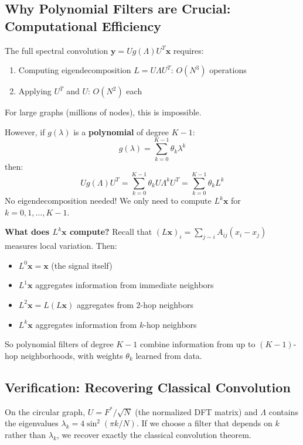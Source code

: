 \begin{notechapter}
\subsection{Why Polynomial Filters are Crucial: Computational Efficiency}

The full spectral convolution $\mathbf{y} = U g(\Lambda) U^T \mathbf{x}$ requires:
\begin{enumerate}
\item Computing eigendecomposition $L = U\Lambda U^T$: $O(N^3)$ operations
\item Applying $U^T$ and $U$: $O(N^2)$ each
\end{enumerate}
For large graphs (millions of nodes), this is impossible.

However, if $g(\lambda)$ is a \textbf{polynomial} of degree $K-1$:
\[
g(\lambda) = \sum_{k=0}^{K-1} \theta_k \lambda^k
\]
then:
\[
U g(\Lambda) U^T = \sum_{k=0}^{K-1} \theta_k U\Lambda^k U^T = \sum_{k=0}^{K-1} \theta_k L^k
\]
No eigendecomposition needed! We only need to compute $L^k \mathbf{x}$ for 
$k = 0, 1, \ldots, K-1$.

\textbf{What does $L^k \mathbf{x}$ compute?}
Recall that $(L\mathbf{x})_i = \sum_{j \sim i} A_{ij}(x_i - x_j)$ measures 
local variation. Then:
\begin{itemize}
\item $L^0\mathbf{x} = \mathbf{x}$ (the signal itself)
\item $L^1\mathbf{x}$ aggregates information from immediate neighbors
\item $L^2\mathbf{x} = L(L\mathbf{x})$ aggregates from 2-hop neighbors
\item $L^k\mathbf{x}$ aggregates information from $k$-hop neighbors
\end{itemize}

So polynomial filters of degree $K-1$ combine information from up to 
$(K-1)$-hop neighborhoods, with weights $\theta_k$ learned from data.

\subsection{Verification: Recovering Classical Convolution}

On the circular graph, $U = F^*/\sqrt{N}$ (the normalized DFT matrix) 
and $\Lambda$ contains the eigenvalues $\lambda_k = 4\sin^2(\pi k/N)$. 
If we choose a filter that depends on $k$ rather than $\lambda_k$, we 
recover exactly the classical convolution theorem.


\end{notechapter}
